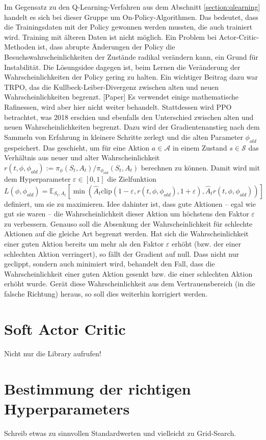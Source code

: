 Im Gegensatz zu den Q-Learning-Verfahren aus dem Abschnitt \ref{section:qlearning} handelt es sich bei dieser Gruppe um On-Policy-Algorithmen.
Das bedeutet, dass die Trainingsdaten mit der Policy gewonnen werden mussten, die auch trainiert wird.
Training mit älteren Daten ist nicht möglich.
Ein Problem bei Actor-Critic-Methoden ist, dass abrupte Änderungen der Policy die Besuchswahrscheinlichkeiten der Zustände radikal verändern kann, ein Grund für Instabilität.
Die Lösungsidee dagegen ist, beim Lernen die Veränderung der Wahrscheinlichkeiten der Policy gering zu halten.
Ein wichtiger Beitrag dazu war TRPO, das die Kullbeck-Leiber-Divergenz zwischen alten und neuen Wahrscheinlichkeiten begrenzt. [Paper]
Es verwendet einige mathematische Rafinessen, wird aber hier nicht weiter behandelt.
Stattdessen wird PPO betrachtet, was 2018 erschien und ebenfalls den Unterschied zwischen alten und neuen Wahrscheinlichkeiten begrenzt.
Dazu wird der Gradientenanstieg nach dem Sammeln von Erfahrung in kleinere Schritte zerlegt und die alten Parameter $\phi_{old}$ gespeichert.
Das geschieht, um für eine Aktion $a \in \mathcal{A}$ in einem Zustand $s \in \mathcal{S}$ das Verhältnis aus neuer und alter Wahrscheinlichkeit $r(t, \phi, \phi_{old}) := \pi_\phi(S_t, A_t) / \pi_{\phi_{old}}(S_t, A_t)$ berechnen zu können.
Damit wird mit dem Hyperparameter $\varepsilon \in [0,1]$ die Zielfunktion
\begin{equation}
    L(\phi, \phi_{old}) = \mathbb{E}_{S_t, A_t}\left[\min{\left(\hat{A}_t \text{clip}{\left(1 - \varepsilon, r(t, \phi, \phi_{old}), 1 + \varepsilon\right)}, \hat{A}_t r(t, \phi, \phi_{old})\right)}\right]
\end{equation}
definiert, um sie zu maximieren.
Idee dahinter ist, dass gute Aktionen -- egal wie gut sie waren -- die Wahrscheinlichkeit dieser Aktion um höchstens den Faktor $\varepsilon$ zu verbessern.
Genauso soll die Absenkung der Wahrscheinlichkeit für schlechte Aktionen auf die gleiche Art begrenzt werden.
Hat sich die Wahrscheinlichkeit einer guten Aktion bereits um mehr als den Faktor $\varepsilon$ erhöht (bzw. der einer schlechten Aktion verringert), so fällt der Gradient auf null.
Dass nicht nur geclippt, sondern auch minimiert wird, behandelt den Fall, dass die Wahrscheinlichkeit einer guten Aktion gesenkt bzw. die einer schlechten Aktion erhöht wurde.
Gerät diese Wahrscheinlichkeit aus dem Vertrauensbereich (in die falsche Richtung) heraus, so soll dies weiterhin korrigiert werden.

\section{Soft Actor Critic}
Nicht nur die Library aufrufen!

\section{Bestimmung der richtigen Hyperparameters}
Schreib etwas zu sinnvollen Standardwerten und vielleicht zu Grid-Search.
